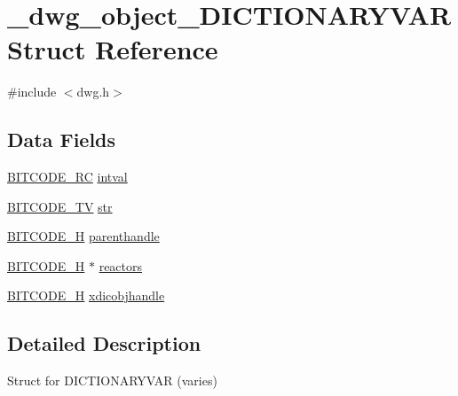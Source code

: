 \hypertarget{struct__dwg__object__DICTIONARYVAR}{\section{\-\_\-dwg\-\_\-object\-\_\-\-D\-I\-C\-T\-I\-O\-N\-A\-R\-Y\-V\-A\-R \-Struct \-Reference}
\label{struct__dwg__object__DICTIONARYVAR}
}


{\ttfamily \#include $<$dwg.\-h$>$}

\subsection*{\-Data \-Fields}
\begin{DoxyCompactItemize}
\item 
\hyperlink{dwg_8h_a7fd199a8f9c9cc52bdab220f65a2a619}{\-B\-I\-T\-C\-O\-D\-E\-\_\-\-R\-C} \hyperlink{struct__dwg__object__DICTIONARYVAR_aa679467908dbfbb3718bca34955c537e}{intval}
\item 
\hyperlink{dwg_8h_a2a7e040c6e36ca039b03608679ecaf7c}{\-B\-I\-T\-C\-O\-D\-E\-\_\-\-T\-V} \hyperlink{struct__dwg__object__DICTIONARYVAR_a530edd1cc409f9e4d6dafe1e5f275895}{str}
\item 
\hyperlink{dwg_8h_a7c700e94e047a97ba8c24bdfe4029dc3}{\-B\-I\-T\-C\-O\-D\-E\-\_\-\-H} \hyperlink{struct__dwg__object__DICTIONARYVAR_af217fb65b9f7d354a45baea502a4e619}{parenthandle}
\item 
\hyperlink{dwg_8h_a7c700e94e047a97ba8c24bdfe4029dc3}{\-B\-I\-T\-C\-O\-D\-E\-\_\-\-H} $\ast$ \hyperlink{struct__dwg__object__DICTIONARYVAR_a394266a085fcc6d441a4dfba1064f152}{reactors}
\item 
\hyperlink{dwg_8h_a7c700e94e047a97ba8c24bdfe4029dc3}{\-B\-I\-T\-C\-O\-D\-E\-\_\-\-H} \hyperlink{struct__dwg__object__DICTIONARYVAR_a3e225d2691ff068f9ffa89bfa13007a3}{xdicobjhandle}
\end{DoxyCompactItemize}


\subsection{\-Detailed \-Description}
\-Struct for \-D\-I\-C\-T\-I\-O\-N\-A\-R\-Y\-V\-A\-R (varies) 

